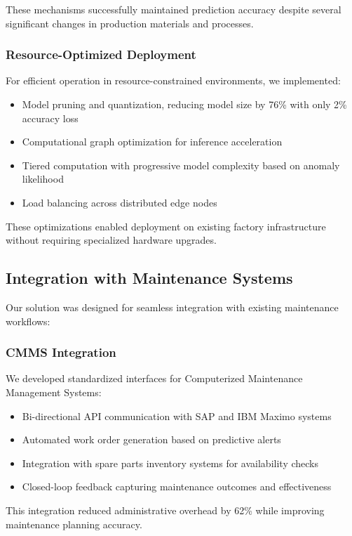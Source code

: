 These mechanisms successfully maintained prediction accuracy despite several significant changes in production materials and processes.

\subsubsection{Resource-Optimized Deployment}
For efficient operation in resource-constrained environments, we implemented:
\begin{itemize}
    \item Model pruning and quantization, reducing model size by 76\% with only 2\% accuracy loss
    \item Computational graph optimization for inference acceleration
    \item Tiered computation with progressive model complexity based on anomaly likelihood
    \item Load balancing across distributed edge nodes
\end{itemize}

These optimizations enabled deployment on existing factory infrastructure without requiring specialized hardware upgrades.

\subsection{Integration with Maintenance Systems}
Our solution was designed for seamless integration with existing maintenance workflows:

\subsubsection{CMMS Integration}
We developed standardized interfaces for Computerized Maintenance Management Systems:
\begin{itemize}
    \item Bi-directional API communication with SAP and IBM Maximo systems
    \item Automated work order generation based on predictive alerts
    \item Integration with spare parts inventory systems for availability checks
    \item Closed-loop feedback capturing maintenance outcomes and effectiveness
\end{itemize}

This integration reduced administrative overhead by 62\% while improving maintenance planning accuracy.

